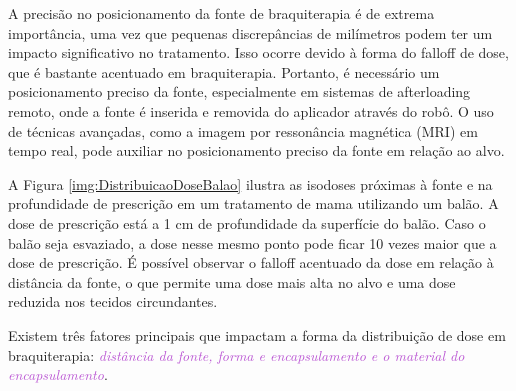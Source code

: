 \documentclass[11pt,a4paper]{article}
\begin{document}
	A precisão no posicionamento da fonte de braquiterapia é de extrema importância, uma vez que pequenas discrepâncias de milímetros podem ter um impacto significativo no tratamento. Isso ocorre devido à forma do falloff de dose, que é bastante acentuado em braquiterapia. Portanto, é necessário um posicionamento preciso da fonte, especialmente em sistemas de afterloading remoto, onde a fonte é inserida e removida do aplicador através do robô. O uso de técnicas avançadas, como a imagem por ressonância magnética (MRI) em tempo real, pode auxiliar no posicionamento preciso da fonte em relação ao alvo.
	
	A Figura \ref{img:DistribuicaoDoseBalao} ilustra as isodoses próximas à fonte e na profundidade de prescrição em um tratamento de mama utilizando um balão. A dose de prescrição está a 1 cm de profundidade da superfície do balão. Caso o balão seja esvaziado, a dose nesse mesmo ponto pode ficar 10 vezes maior que a dose de prescrição. É possível observar o falloff acentuado da dose em relação à distância da fonte, o que permite uma dose mais alta no alvo e uma dose reduzida nos tecidos circundantes.

		Existem três fatores principais que impactam a forma da distribuição de dose em braquiterapia:  \textit{\textcolor{MediumOrchid}{distância da fonte, forma e encapsulamento e o material do encapsulamento}}.
\end{document}
